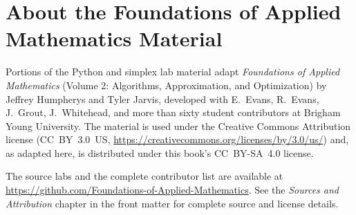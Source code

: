\section*{About the Foundations of Applied Mathematics Material}

Portions of the Python and simplex lab material adapt \emph{Foundations of
Applied Mathematics} (Volume 2: Algorithms, Approximation, and
Optimization) by Jeffrey Humpherys and Tyler Jarvis, developed with
E.~Evans, R.~Evans, J.~Grout, J.~Whitehead, and more than sixty student
contributors at Brigham Young University. The material is used under the
Creative Commons Attribution license (CC~BY~3.0~US,
\url{https://creativecommons.org/licenses/by/3.0/us/}) and, as adapted
here, is distributed under this book's CC~BY-SA~4.0 license.

The source labs and the complete contributor list are available at
\url{https://github.com/Foundations-of-Applied-Mathematics}. See the
\emph{Sources and Attribution} chapter in the front matter for complete
source and license details.
